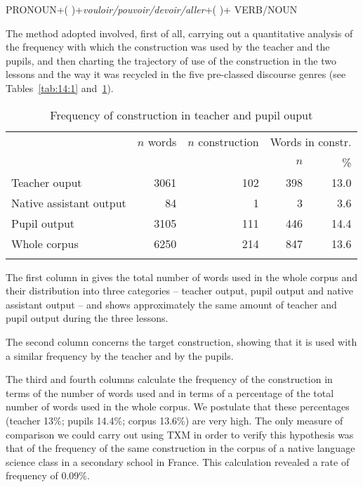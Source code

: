 \documentclass[output=paper]{langscibook}
\begin{document}
\ea PRONOUN+( )+\textit{vouloir/pouvoir/devoir/aller}+( )+ VERB/NOUN\z

The method adopted involved, first of all, carrying out a quantitative analysis of the frequency with which the construction was used by the teacher and the pupils, and then charting the trajectory of use of the construction in the two lessons and the way it was recycled in the five pre-classed discourse genres (see Tables~\ref{tab:14:1} and~\ref{tab:14:2}).

\begin{table}
\caption{Frequency of construction in teacher and pupil ouput}
\label{tab:14:2}

\begin{tabular}{l rrrr} 
\lsptoprule
& {$n$ words} & {$n$ construction}  & \multicolumn{2}{c}{Words in constr.}\\\cmidrule(lr){4-5}
&                   &                             & $n$ & \%\\\midrule
{Teacher ouput} & 3061 & 102 & 398 & 13.0\\
{Native assistant output} & 84 & 1 & 3 & 3.6\\
{Pupil output} & 3105 & 111 & 446 & 14.4\\
{Whole corpus} & 6250 & 214 & 847 & 13.6\\
\lspbottomrule
\end{tabular}
\end{table}

The first column in  gives the total number of words used in the whole corpus and their distribution into three categories – teacher output, pupil output and native assistant output – and shows approximately the same amount of teacher and pupil output during the three lessons.

The second column concerns the target construction, showing that it is used with a similar frequency by the teacher and by the pupils.

The third and fourth columns calculate the frequency of the construction in terms of the number of words used and in terms of a percentage of the total number of words used in the whole corpus. We postulate that these percentages (teacher 13\%; pupils 14.4\%; corpus 13.6\%) are very high. The only measure of comparison we could carry out using TXM in order to verify this hypothesis was that of the frequency of the same construction in the corpus of a native language science class in a secondary school in France. This calculation revealed a rate of frequency of 0.09\%.
\end{document}
